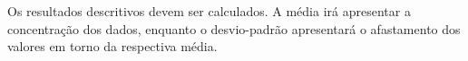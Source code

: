 \documentclass[
]{book}
\newenvironment{Shaded}{\begin{snugshade}}{\end{snugshade}}
\newcommand{\DataTypeTok}[1]{\textcolor[rgb]{0.13,0.29,0.53}{#1}}
\newcommand{\KeywordTok}[1]{\textcolor[rgb]{0.13,0.29,0.53}{\textbf{#1}}}
\newcommand{\NormalTok}[1]{#1}
\newcommand{\OperatorTok}[1]{\textcolor[rgb]{0.81,0.36,0.00}{\textbf{#1}}}
\newcommand{\StringTok}[1]{\textcolor[rgb]{0.31,0.60,0.02}{#1}}
\begin{document}
Os resultados descritivos devem ser calculados. A média irá apresentar a
concentração dos dados, enquanto o desvio-padrão apresentará o
afastamento dos valores em torno da respectiva média.

\begin{Shaded}
\end{Shaded}
\end{document}
